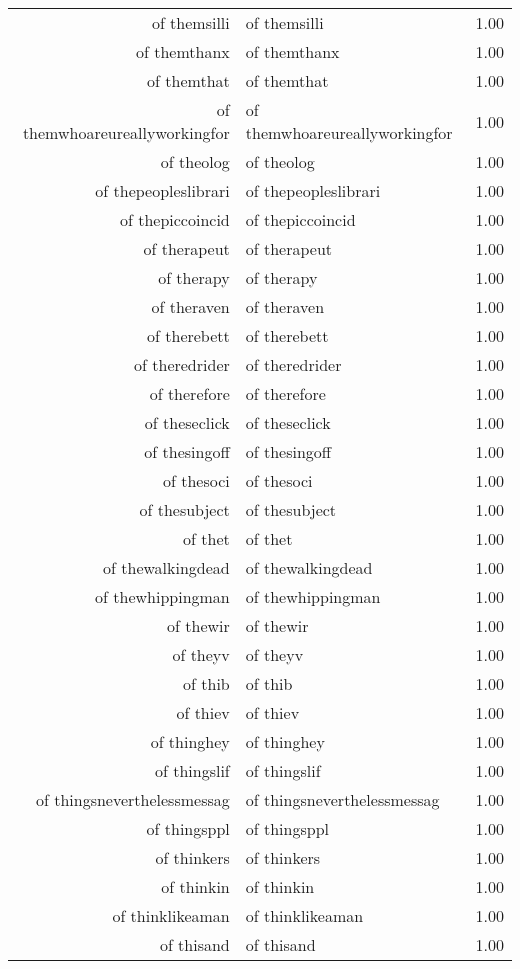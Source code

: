 \begin{table}[ht]
\begin{tabular}{rlr}
  of themsilli & of themsilli & 1.00 \\ 
  of themthanx & of themthanx & 1.00 \\ 
  of themthat & of themthat & 1.00 \\ 
  of themwhoareureallyworkingfor & of themwhoareureallyworkingfor & 1.00 \\ 
  of theolog & of theolog & 1.00 \\ 
  of thepeopleslibrari & of thepeopleslibrari & 1.00 \\ 
  of thepiccoincid & of thepiccoincid & 1.00 \\ 
  of therapeut & of therapeut & 1.00 \\ 
  of therapy & of therapy & 1.00 \\ 
  of theraven & of theraven & 1.00 \\ 
  of therebett & of therebett & 1.00 \\ 
  of theredrider & of theredrider & 1.00 \\ 
  of therefore & of therefore & 1.00 \\ 
  of theseclick & of theseclick & 1.00 \\ 
  of thesingoff & of thesingoff & 1.00 \\ 
  of thesoci & of thesoci & 1.00 \\ 
  of thesubject & of thesubject & 1.00 \\ 
  of thet & of thet & 1.00 \\ 
  of thewalkingdead & of thewalkingdead & 1.00 \\ 
  of thewhippingman & of thewhippingman & 1.00 \\ 
  of thewir & of thewir & 1.00 \\ 
  of theyv & of theyv & 1.00 \\ 
  of thib & of thib & 1.00 \\ 
  of thiev & of thiev & 1.00 \\ 
  of thinghey & of thinghey & 1.00 \\ 
  of thingslif & of thingslif & 1.00 \\ 
  of thingsneverthelessmessag & of thingsneverthelessmessag & 1.00 \\ 
  of thingsppl & of thingsppl & 1.00 \\ 
  of thinkers & of thinkers & 1.00 \\ 
  of thinkin & of thinkin & 1.00 \\ 
  of thinklikeaman & of thinklikeaman & 1.00 \\ 
  of thisand & of thisand & 1.00 \\ 

\end{tabular}
\end{table}
